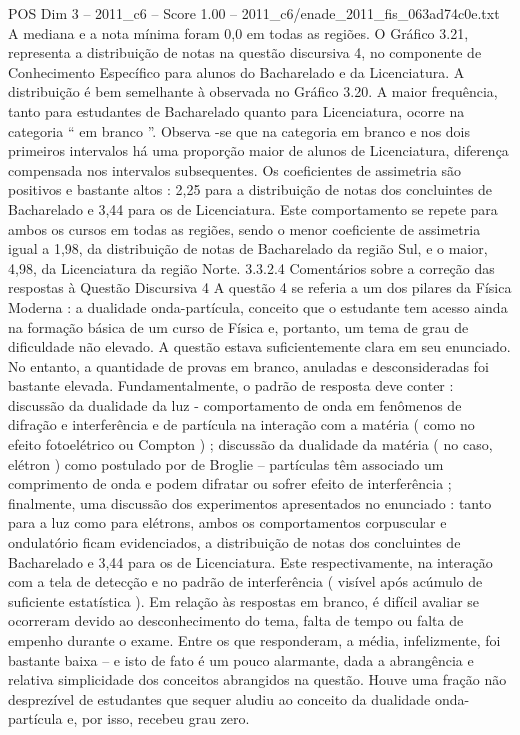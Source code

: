 \begin{textsample}{POS Dim 3 – 2011\_c6 – Score 1.00 – 2011\_c6/enade\_2011\_fis\_063ad74c0e.txt}
A mediana e a nota mínima foram 0,0 em todas as regiões.
O Gráfico 3.21, representa a distribuição de notas na questão discursiva 4, no componente de Conhecimento Específico para alunos do Bacharelado e da Licenciatura.
A distribuição é bem semelhante à observada no Gráfico 3.20.
A maior frequência, tanto para estudantes de Bacharelado quanto para Licenciatura, ocorre na categoria “ em branco ”.
Observa -se que na categoria em branco e nos dois primeiros intervalos há uma proporção maior de alunos de Licenciatura, diferença compensada nos intervalos subsequentes.
Os coeficientes de assimetria são positivos e bastante altos : 2,25 para a distribuição de notas dos concluintes de Bacharelado e 3,44 para os de Licenciatura.
Este comportamento se repete para ambos os cursos em todas as regiões, sendo o menor coeficiente de assimetria igual a 1,98, da distribuição de notas de Bacharelado da região Sul, e o maior, 4,98, da Licenciatura da região Norte. 3.3.2.4 Comentários sobre a correção das respostas à Questão Discursiva 4 A questão 4 se referia a um dos pilares da Física Moderna : a dualidade onda-partícula, conceito que o estudante tem acesso ainda na formação básica de um curso de Física e, portanto, um tema de grau de dificuldade não elevado.
A questão estava suficientemente clara em seu enunciado.
No entanto, a quantidade de provas em branco, anuladas e desconsideradas foi bastante elevada.
Fundamentalmente, o padrão de resposta deve conter : discussão da dualidade da luz - comportamento de onda em fenômenos de difração e interferência e de partícula na interação com a matéria ( como no efeito fotoelétrico ou Compton ) ; discussão da dualidade da matéria ( no caso, elétron ) como postulado por de Broglie – partículas têm associado um comprimento de onda e podem difratar ou sofrer efeito de interferência ; finalmente, uma discussão dos experimentos apresentados no enunciado : tanto para a luz como para elétrons, ambos os comportamentos corpuscular e ondulatório ficam evidenciados, a distribuição de notas dos concluintes de Bacharelado e 3,44 para os de Licenciatura.
Este respectivamente, na interação com a tela de detecção e no padrão de interferência ( visível após acúmulo de suficiente estatística ).
Em relação às respostas em branco, é difícil avaliar se ocorreram devido ao desconhecimento do tema, falta de tempo ou falta de empenho durante o exame.
Entre os que responderam, a média, infelizmente, foi bastante baixa – e isto de fato é um pouco alarmante, dada a abrangência e relativa simplicidade dos conceitos abrangidos na questão.
Houve uma fração não desprezível de estudantes que sequer aludiu ao conceito da dualidade onda-partícula e, por isso, recebeu grau zero.

\end{textsample}
